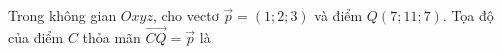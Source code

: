 \begin{ex}
Trong không gian $Oxyz$, cho vectơ $\vec p=(1;2;3)$ và điểm $Q(7;11;7)$. Tọa độ của điểm $C$ thỏa mãn $\overrightarrow{CQ}=\vec p$ là
\end{ex}

